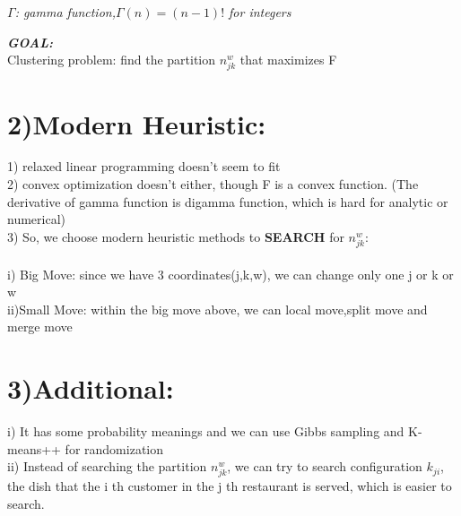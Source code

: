 \documentclass{article}
\begin{document}
\begin{spacing}{1.1}
\emph{$\Gamma$: gamma function,$\Gamma(n)=(n-1)! $ for integers}

{\bf \emph{GOAL:}}\\
Clustering problem: find the partition $n_{jk}^{w}$ that maximizes F

\section{2)Modern Heuristic:}
1) relaxed linear programming doesn't seem to fit\\
2) convex optimization doesn't either, though F is a convex function. (The derivative of gamma function is digamma function, which is hard for analytic or numerical)\\
3) So, we choose modern heuristic methods to {\bf SEARCH } for $n_{jk}^{w}$:\\ \\
i) Big Move: since we have 3 coordinates(j,k,w), we can change only one j or k or w\\
ii)Small Move: within the big move above, we can local move,split move and merge move 
\section{3)Additional:}
i) It has some probability meanings and we can use Gibbs sampling and K-means++ for randomization \\
ii) Instead of searching the partition $n_{jk}^{w}$, we can try to search configuration $k_{ji}$, the dish that the i th customer in the j th restaurant is served,
which is easier to search.
\end{spacing}
\end{document}
